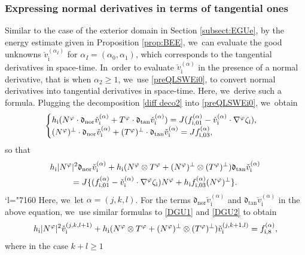 \documentclass[JEP,XML,SOM,Unicode,NoFloatCountersInSection,published]{cedram}
\newcommand{\Changel}{\mathcode`l="7160}
\newcommand{\dtan}{{\mathfrak d}_\mathrm{tan}}
\newcommand{\dnor}{{\mathfrak d}_\mathrm{nor}}
\theoremstyle{definition}
\begin{document}
\subsubsection{Expressing normal derivatives in terms of tangential ones}
Similar to the case of the exterior domain in Section \ref{subsect:EGUe}, by the energy estimate given in Proposition \ref{prop:BEE}, we~can evaluate the good unknowns $\check{v}_\mathrm{i}^{(\alpha_I)}$ for $\alpha_I=(\alpha_0,\alpha_1)$,
which corresponds to the tangential derivatives in space-time. In~order to evaluate $\check{v}_\mathrm{i}^{(\alpha)}$ in the presence of a normal derivative, that is when $\alpha_2\geq 1$, we~use \eqref{preQLSWEi0},
to convert normal derivatives into tangential derivatives in space-time.
Here, we~derive such a formula.
Plugging the decomposition \eqref{diff deco2} into \eqref{preQLSWEi0}, we~obtain
\[
\begin{cases}
h_\mathrm{i}(N^\varphi\cdot\dnor\check{v}_\mathrm{i}^{(\alpha)} + T^\varphi\cdot\dtan\check{v}_\mathrm{i}^{(\alpha)})
= J(f_{{\rm i}, 01}^{(\alpha)} - \check{v}_\mathrm{i}^{(\alpha)}\cdot\nabla^\varphi\zeta_\mathrm{i}), \\
(N^\varphi)^\perp\cdot\dnor\check{v}_\mathrm{i}^{(\alpha)} + (T^\varphi)^\perp\cdot\dtan\check{v}_\mathrm{i}^{(\alpha)} = Jf_{{\rm i},03}^{(\alpha)},
\end{cases}
\]
so that
\begin{multline*}
h_\mathrm{i}|N^\varphi|^2\dnor\check{v}_\mathrm{i}^{(\alpha)}
+ h_\mathrm{i}(N^\varphi\otimes T^\varphi + (N^\varphi)^\perp\otimes(T^\varphi)^\perp)\dtan\check{v}_\mathrm{i}^{(\alpha)} \\
= J\{ (f_{{\rm i}, 01}^{(\alpha)} - \check{v}_\mathrm{i}^{(\alpha)}\cdot\nabla^\varphi\zeta_\mathrm{i})N^\varphi
+ h_\mathrm{i }f_{{\rm i},03}^{(\alpha)}(N^\varphi)^\perp \}.
\end{multline*}%
\Changel%
Here, we~let $\alpha=(j,k,l)$.
For the terms $\dnor\check{v}_\mathrm{i}^{(\alpha)}$ and $\dtan\check{v}_\mathrm{i}^{(\alpha)}$ in the above equation, we~use similar formulas to \eqref{DGU1} and \eqref{DGU2} to obtain
\begin{equation}\label{QLSWEi2}
h_\mathrm{i}|N^\varphi|^2\check{v}_\mathrm{i}^{(j,k,l+1)}
+ h_\mathrm{i}(N^\varphi\otimes T^\varphi + (N^\varphi)^\perp\otimes(T^\varphi)^\perp)\check{v}_\mathrm{i}^{(j,k+1,l)} = f_{{\rm i},8}^{(\alpha)},
\end{equation}
where in the case $k+l\geq1$
\end{document}
